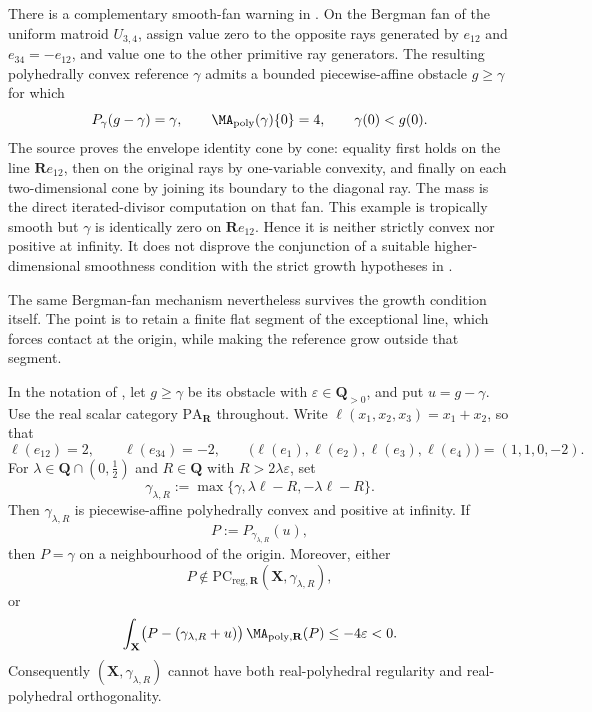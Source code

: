 There is a complementary smooth-fan warning in
\cite[Example~6.24, Claim~6.25, and Remark~6.26]{BMPS26}.  On the Bergman
fan of the uniform matroid \(U_{3,4}\), assign value zero to the opposite
rays generated by \(e_{12}\) and \(e_{34}=-e_{12}\), and value one to the
other primitive ray generators.  The resulting polyhedrally convex
reference \(\gamma\) admits a bounded piecewise-affine obstacle \(g\geq
\gamma\) for which
\[
 P_\gamma(g-\gamma)=\gamma,
 \qquad
 \MA_{\mathrm{poly}}(\gamma)\{0\}=4,
 \qquad
 \gamma(0)<g(0).
\]
The source proves the envelope identity cone by cone: equality first holds
on the line \(\mathbf R e_{12}\), then on the original rays by one-variable
convexity, and finally on each two-dimensional cone by joining its boundary
to the diagonal ray.  The mass is the direct iterated-divisor computation
on that fan.  This example is tropically smooth but \(\gamma\) is identically
zero on \(\mathbf R e_{12}\).  Hence it is neither strictly convex nor
positive at infinity.  It does not disprove the conjunction of a suitable
higher-dimensional smoothness condition with the strict growth hypotheses
in .

The same Bergman-fan mechanism nevertheless survives the growth condition
itself.  The point is to retain a finite flat segment of the exceptional
line, which forces contact at the origin, while making the reference grow
outside that segment.

\begin{proposition}\label{prop:frontier-polyhedral-bergman-positive-infinity-obstruction}
In the notation of \cite[Example~6.24 and Claim~6.25]{BMPS26}, let
\(g\geq\gamma\) be its obstacle with
\(\varepsilon\in\mathbf Q_{>0}\), and put \(u=g-\gamma\).
Use the real scalar category \(\mathrm{PA}_{\mathbf R}\) throughout.
Write
\(\ell(x_1,x_2,x_3)=x_1+x_2\), so that
\[
 \ell(e_{12})=2,
 \qquad
 \ell(e_{34})=-2,
 \qquad
 \bigl(\ell(e_1),\ell(e_2),\ell(e_3),\ell(e_4)\bigr)
   =(1,1,0,-2).
\]
For \(\lambda\in\mathbf Q\cap(0,\tfrac12)\) and
\(R\in\mathbf Q\) with \(R>2\lambda\varepsilon\), set
\[
 \gamma_{\lambda,R}
   :=\max\{\gamma,\lambda\ell-R,-\lambda\ell-R\}.
\]
Then \(\gamma_{\lambda,R}\) is piecewise-affine polyhedrally convex and
positive at infinity.  If
\[
 P:=P_{\gamma_{\lambda,R}}(u),
\]
then \(P=\gamma\) on a neighbourhood of the origin.  Moreover, either
\[
 P\notin
 \mathrm{PC}_{\mathrm{reg},\mathbf R}
     (\mathbf X,\gamma_{\lambda,R}),
\]
or
\[
 \int_{\mathbf X}
 \bigl(P-(\gamma_{\lambda,R}+u)\bigr)\,
 \MA_{\mathrm{poly},\mathbf R}(P)
 \leq -4\varepsilon<0.
\]
Consequently \((\mathbf X,\gamma_{\lambda,R})\) cannot have both
real-polyhedral regularity and real-polyhedral orthogonality.
\end{proposition}

